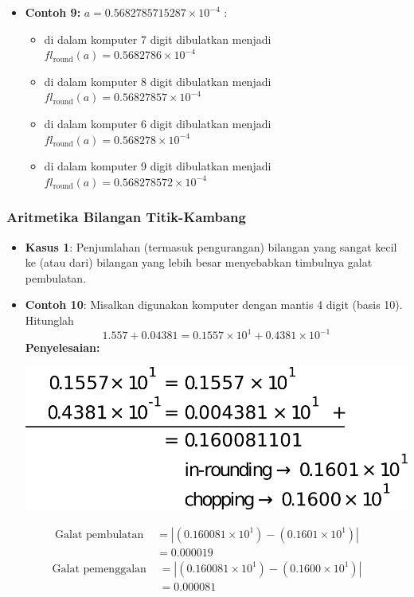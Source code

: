 \documentclass[pdflatex,compress]{beamer}
\begin{document}
\begin{frame}
	\begin{itemize}
		\item \textbf{Contoh 9:} $ a = 0.5682785715287 \times 10^{-4} $ :
		\begin{itemize}
			\item di dalam komputer 7 digit dibulatkan menjadi $ fl_{\text{round}}(a) =  0.5682786 \times 10^{-4} $
			\item di dalam komputer 8 digit dibulatkan menjadi $ fl_{\text{round}}(a) =  0.56827857 \times 10^{-4} $
			\item di dalam komputer 6 digit dibulatkan menjadi $ fl_{\text{round}}(a) =  0.568278 \times 10^{-4} $
			\item di dalam komputer 9 digit dibulatkan menjadi $ fl_{\text{round}}(a) =  0.568278572 \times 10^{-4} $
		\end{itemize}
	\end{itemize}
\end{frame}

\begin{frame}
	\frametitle{Aritmetika Bilangan Titik-Kambang}
	\begin{itemize}
		\item \textbf{Kasus 1}: Penjumlahan (termasuk pengurangan) bilangan yang sangat kecil ke (atau dari) bilangan yang lebih besar menyebabkan timbulnya galat pembulatan.
		\item \textbf{Contoh 10}: Misalkan digunakan komputer dengan mantis 4 digit (basis 10). Hitunglah
		\[ 1.557 + 0.04381 = 0.1557 \times 10^1 + 0.4381 \times 10^{-1} \]
		\textbf{Penyelesaian:}
		\begin{center}
			\includegraphics[width=0.6\linewidth]{img/img104.png}
		\end{center}
	\end{itemize}
\end{frame}

\begin{frame}
	\begin{align*}
		\text{Galat pembulatan }&= | (0.160081 \times 10^1) - (0.1601 \times 10^1)| \\ &= 0.000019
	\end{align*}
	\begin{align*}
		\text{Galat pemenggalan } &= | (0.160081 \times 10^1) - (0.1600 \times 10^1)| \\&= 0.000081
	\end{align*}
\end{frame}
\end{document}
